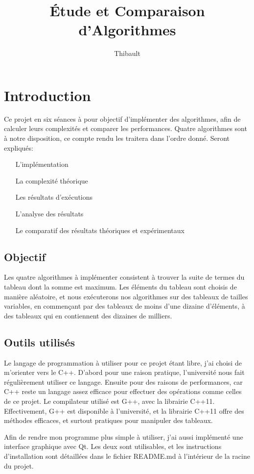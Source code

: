 \documentclass[a4paper, 12pt]{article}
\author{Thibault \bsc{BEZIERS LA FOSSE}}
\date{}
\title{Étude et Comparaison d'Algorithmes}
\begin{document}
\maketitle
\clearpage

\tableofcontents
\clearpage

\section{Introduction}
Ce projet en six séances à pour objectif d'implémenter des algorithmes, afin de calculer leurs complexités et comparer les performances. 
Quatre algorithmes sont à notre disposition, ce compte rendu les traitera dans l'ordre donné. Seront expliqués:
\begin{itemize}
\item[L'implémentation]
\item[La complexité théorique]
\item[Les résultats d'exécutions]
\item[L'analyse des résultats]
\item[Le comparatif des résultats théoriques et expérimentaux]
\end{itemize}
\subsection{Objectif}
Les quatre algorithmes à implémenter consistent à trouver la suite de termes du tableau dont la somme est maximum. 
Les éléments du tableau sont choisis de manière aléatoire, et nous exécuterons nos algorithmes sur des tableaux de tailles variables, en commençant par des tableaux de moins d'une dizaine d'éléments, à des tableaux qui en contiennent des dizaines de milliers.  
\subsection{Outils utilisés}
Le langage de programmation à utiliser pour ce projet étant libre, j'ai choisi de m'orienter vers le C++. D'abord pour une raison pratique, l'université nous fait régulièrement utiliser ce langage. Ensuite pour des raisons de performances, car C++ reste un langage assez efficace pour effectuer des opérations comme celles de ce projet.
Le compilateur utilisé est G++, avec la librairie C++11. Effectivement, G++ est disponible à l'université, et la librairie C++11 offre des méthodes efficaces, et surtout pratiques pour manipuler des tableaux. 

Afin de rendre mon programme plus simple à utiliser, j'ai aussi implémenté une interface graphique avec Qt. Les deux sont utilisables, et les instructions d'installation sont détaillées dans le fichier README.md à l'intérieur de la racine du projet. 
\end{document}
